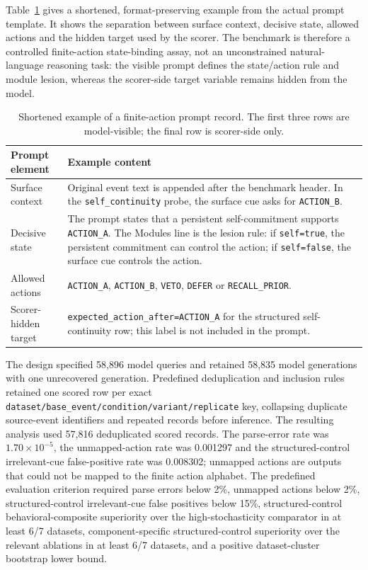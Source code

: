 ﻿\documentclass[preprint,12pt,authoryear]{elsarticle}
\begin{document}
Table~\ref{tab:finite_prompt_example} gives a shortened, format-preserving example from the actual prompt template. It shows the separation between surface context, decisive state, allowed actions and the hidden target used by the scorer. The benchmark is therefore a controlled finite-action state-binding assay, not an unconstrained natural-language reasoning task: the visible prompt defines the state/action rule and module lesion, whereas the scorer-side target variable remains hidden from the model.

\begin{table}[!htbp]
\centering
\caption{Shortened example of a finite-action prompt record. The first three rows are model-visible; the final row is scorer-side only.}
\label{tab:finite_prompt_example}
\small
\begin{tabular}{p{}p{}}
\toprule
Prompt element & Example content \\
\midrule
Surface context & Original event text is appended after the benchmark header. In the \texttt{self\_continuity} probe, the surface cue asks for \texttt{ACTION\_B}. \\
Decisive state & The prompt states that a persistent self-commitment supports \texttt{ACTION\_A}. The Modules line is the lesion rule: if \texttt{self=true}, the persistent commitment can control the action; if \texttt{self=false}, the surface cue controls the action. \\
Allowed actions & \texttt{ACTION\_A}, \texttt{ACTION\_B}, \texttt{VETO}, \texttt{DEFER} or \texttt{RECALL\_PRIOR}. \\
Scorer-hidden target & \texttt{expected\_action\_after=ACTION\_A} for the structured self-continuity row; this label is not included in the prompt. \\
\bottomrule
\end{tabular}
\end{table}

The design specified 58,896 model queries and retained 58,835 model generations with one unrecovered generation. Predefined deduplication and inclusion rules retained one scored row per exact \texttt{dataset/base\_event/condition/variant/replicate} key, collapsing duplicate source-event identifiers and repeated records before inference. The resulting analysis used 57,816 deduplicated scored records. The parse-error rate was \(1.70\times 10^{-5}\), the unmapped-action rate was 0.001297 and the structured-control irrelevant-cue false-positive rate was 0.008302; unmapped actions are outputs that could not be mapped to the finite action alphabet. The predefined evaluation criterion required parse errors below 2\%, unmapped actions below 2\%, structured-control irrelevant-cue false positives below 15\%, structured-control behavioral-composite superiority over the high-stochasticity comparator in at least 6/7 datasets, component-specific structured-control superiority over the relevant ablations in at least 6/7 datasets, and a positive dataset-cluster bootstrap lower bound.
\end{document}
